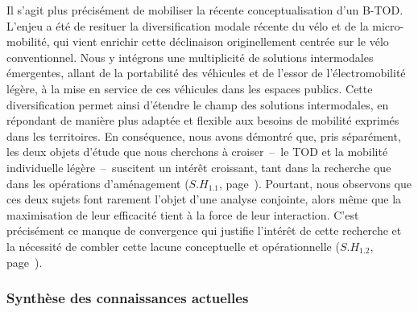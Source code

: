 \begin{refsegment}
Il s'agit plus précisément de mobiliser la récente conceptualisation d'un \acrfull{B-TOD}. L'enjeu a été de resituer la diversification modale récente du \gls{vélo} et de la \gls{micro-mobilité}, qui vient enrichir cette déclinaison originellement centrée sur le vélo conventionnel. Nous y intégrons une multiplicité de solutions intermodales émergentes, allant de la portabilité des véhicules et de l'essor de l'électromobilité légère, à la mise en service de ces véhicules dans les espaces publics. Cette diversification permet ainsi d’étendre le champ des solutions intermodales, en répondant de manière plus adaptée et flexible aux besoins de mobilité exprimés dans les territoires. En conséquence, nous avons démontré que, pris séparément, les deux objets d’étude que nous cherchons à croiser~–~le \acrshort{TOD} et la mobilité individuelle légère~–~suscitent un intérêt croissant, tant dans la recherche que dans les opérations d'aménagement (\hyperref[sous-hypothese-1.1]{\(S.H_{1.1}\)}, page~\pageref{sous-hypothese-1.1}). Pourtant, nous observons que ces deux sujets font rarement l'objet d'une analyse conjointe, alors même que la maximisation de leur efficacité tient à la force de leur interaction. C’est précisément ce manque de convergence qui justifie l’intérêt de cette recherche et la nécessité de combler cette lacune conceptuelle et opérationnelle (\hyperref[sous-hypothese-1.2]{\(S.H_{1.2}\)}, page~\pageref{sous-hypothese-1.2}).%



\subsubsection*{Synthèse des connaissances actuelles
    \label{conclusion-generale:principaux-apports-chapitre2}
    }


\end{refsegment}
